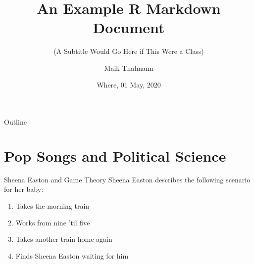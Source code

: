 \documentclass[10pt,ignorenonframetext,,aspectratio=149]{beamer}
\title{An Example R Markdown Document}
\subtitle{(A Subtitle Would Go Here if This Were a Class)}
\author{Maik Thalmann}
\date{Where, 01 May, 2020}
\institute{Georg-August-University Göttingen}
\providecommand{\tightlist}{%
  \setlength{\itemsep}{0pt}\setlength{\parskip}{0pt}}
\begin{document}
\frame{\titlepage}

\begin{frame}{Outline}
  \tableofcontents
\end{frame}

\hypertarget{pop-songs-and-political-science}{%
\section{Pop Songs and Political
Science}\label{pop-songs-and-political-science}}

\begin{frame}{Sheena Easton and Game Theory}
\protect\hypertarget{sheena-easton-and-game-theory}{}
Sheena Easton describes the following scenario for her baby:

\begin{enumerate}
\tightlist
\item
  Takes the morning train
\item
  Works from nine 'til five
\item
  Takes another train home again
\item
  Finds Sheena Easton waiting for him
\end{enumerate}
\end{frame}
\end{document}
